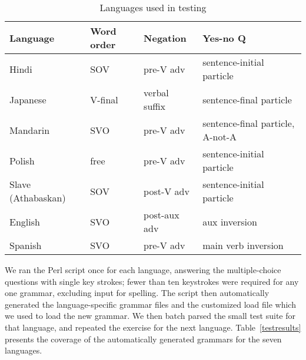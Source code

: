 \begin{table*}[ht]
\begin{center}
\small
\begin{tabular}{llll}
\hline
Language\footnotemark & Word order & Negation & Yes-no Q\footnotemark \\ \hline
Hindi    & SOV        & pre-V adv 	& sentence-initial particle\\
Japanese & V-final    & verbal suffix   & sentence-final particle\\
Mandarin & SVO	      & pre-V adv	& sentence-final particle, A-not-A \\
Polish   & free	      & pre-V adv       & sentence-initial particle  \\
Slave (Athabaskan) & SOV & post-V adv	& sentence-initial particle \\
English  & SVO	      & post-aux adv	& aux inversion \\
Spanish  & SVO	      & pre-V adv	& main verb inversion \\ \hline
\end{tabular}
\end{center}
\caption{Languages used in testing}
\label{testsuitetable}
\end{table*}

\addtocounter{footnote}{-1}
\addtocounter{footnote}{1}

We ran the Perl script once for each language, answering the
multiple-choice questions with single key strokes; fewer than ten
keystrokes were required for any one grammar, excluding input for
spelling.  The script then automatically generated the
language-specific grammar files and the customized load file
which we used to load the new grammar.  We then batch parsed the small
test suite for that language, and repeated the exercise for the next
language.  Table~\ref{testresults} presents the coverage of the
automatically generated grammars for the seven languages.

